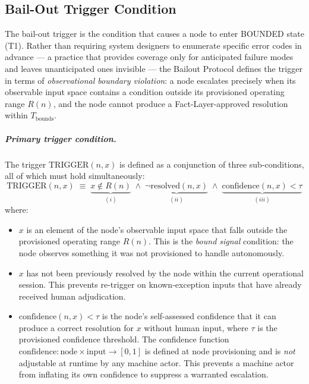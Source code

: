 \subsection{Bail-Out Trigger Condition}\label{sec:bailout-trigger}

The bail-out trigger is the condition that causes a node to enter BOUNDED state (T1). Rather than requiring system designers to enumerate specific error codes in advance — a practice that provides coverage only for anticipated failure modes and leaves unanticipated ones invisible — the Bailout Protocol defines the trigger in terms of \emph{observational boundary violation}: a node escalates precisely when its observable input space contains a condition outside its provisioned operating range $R(n)$, and the node cannot produce a Fact-Layer-approved resolution within $T_{\text{bounds}}$.

\subparagraph{Primary trigger condition.} The trigger $\text{TRIGGER}(n, x)$ is defined as a conjunction of three sub-conditions, all of which must hold simultaneously:
\begin{equation}
\text{TRIGGER}(n, x) \;\equiv\; \underbrace{x \notin R(n)}_{(i)} \;\land\; \underbrace{\neg\text{resolved}(n, x)}_{(ii)} \;\land\; \underbrace{\text{confidence}(n, x) < \tau}_{(iii)} \tag{TC}
\end{equation}
where:

\begin{itemize}\itemsep0em
\item[(i)] $x$ is an element of the node's observable input space that falls outside the provisioned operating range $R(n)$. This is the \emph{bound signal} condition: the node observes something it was not provisioned to handle autonomously.
\item[(ii)] $x$ has not been previously resolved by the node within the current operational session. This prevents re-trigger on known-exception inputs that have already received human adjudication.
\item[(iii)] $\text{confidence}(n, x) < \tau$ is the node's self-assessed confidence that it can produce a correct resolution for $x$ without human input, where $\tau$ is the provisioned confidence threshold. The confidence function $\text{confidence} : \text{node} \times \text{input} \rightarrow [0, 1]$ is defined at node provisioning and is \emph{not} adjustable at runtime by any machine actor. This prevents a machine actor from inflating its own confidence to suppress a warranted escalation.
\end{itemize}

